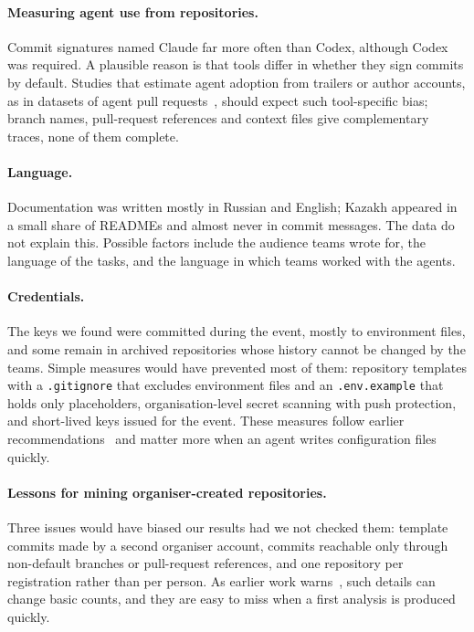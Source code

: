 \documentclass{article}
\begin{document}
\paragraph{Measuring agent use from repositories.}
Commit signatures named Claude far more often than Codex, although Codex was required. A plausible reason is that tools differ in whether they sign commits by default. Studies that estimate agent adoption from trailers or author accounts, as in datasets of agent pull requests~\cite{li2025aidev}, should expect such tool-specific bias; branch names, pull-request references and context files give complementary traces, none of them complete.

\paragraph{Language.}
Documentation was written mostly in Russian and English; Kazakh appeared in a small share of READMEs and almost never in commit messages. The data do not explain this. Possible factors include the audience teams wrote for, the language of the tasks, and the language in which teams worked with the agents.

\paragraph{Credentials.}
The keys we found were committed during the event, mostly to environment files, and some remain in archived repositories whose history cannot be changed by the teams. Simple measures would have prevented most of them: repository templates with a \texttt{.gitignore} that excludes environment files and an \texttt{.env.example} that holds only placeholders, organisation-level secret scanning with push protection, and short-lived keys issued for the event. These measures follow earlier recommendations~\cite{meli2019git,krause2022pushed} and matter more when an agent writes configuration files quickly.

\paragraph{Lessons for mining organiser-created repositories.}
Three issues would have biased our results had we not checked them: template commits made by a second organiser account, commits reachable only through non-default branches or pull-request references, and one repository per registration rather than per person. As earlier work warns~\cite{kalliamvakou2014perils,hoess2025toolmatter}, such details can change basic counts, and they are easy to miss when a first analysis is produced quickly.
\end{document}
